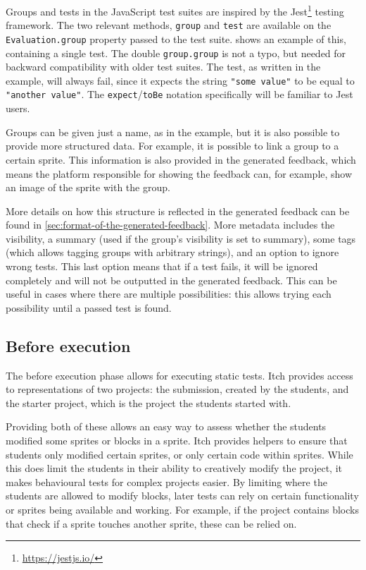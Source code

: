 \documentclass[../main]{subfiles}
\begin{document}
Groups and tests in the JavaScript test suites are inspired by the Jest\footnote{\url{https://jestjs.io/}} testing framework.
The two relevant methods, \texttt{group} and \texttt{test} are available on the \texttt{Evaluation.group} property passed to the test suite.
 shows an example of this, containing a single test.
The double \texttt{group.group} is not a typo, but needed for backward compatibility with older test suites.
The test, as written in the example, will always fail, since it expects the string \texttt{"some value"} to be equal to \texttt{"another value"}.
The \texttt{expect}/\texttt{toBe} notation specifically will be familiar to Jest users.

Groups can be given just a name, as in the example, but it is also possible to provide more structured data.
For example, it is possible to link a group to a certain sprite.
This information is also provided in the generated feedback, which means the platform responsible for showing the feedback can, for example, show an image of the sprite with the group.

More details on how this structure is reflected in the generated feedback can be found in \cref{sec:format-of-the-generated-feedback}.
More metadata includes the visibility, a summary (used if the group's visibility is set to summary), some tags (which allows tagging groups with arbitrary strings), and an option to ignore wrong tests.
This last option means that if a test fails, it will be ignored completely and will not be outputted in the generated feedback.
This can be useful in cases where there are multiple possibilities: this allows trying each possibility until a passed test is found.

\subsection{Before execution}\label{subsec:before-execution}

The before execution phase allows for executing static tests.
Itch provides access to representations of two projects: the submission, created by the students, and the starter project, which is the project the students started with.

Providing both of these allows an easy way to assess whether the students modified some sprites or blocks in a sprite.
Itch provides helpers to ensure that students only modified certain sprites, or only certain code within sprites.
While this does limit the students in their ability to creatively modify the project, it makes behavioural tests for complex projects easier.
By limiting where the students are allowed to modify blocks, later tests can rely on certain functionality or sprites being available and working.
For example, if the project contains blocks that check if a sprite touches another sprite, these can be relied on.
\end{document}
